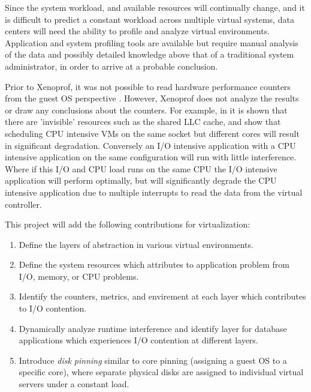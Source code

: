 Since the system workload, and available resources will continually change, and it is difficult to predict a constant workload across multiple virtual systems, data centers will need the ability to profile and analyze virtual environments.  Application and system profiling tools are available but require manual analysis of the data and possibly detailed knowledge above that of a traditional system administrator, in order to arrive at a probable conclusion.   

\indent Prior to Xenoprof, it was not possible to read hardware performance counters from the guest OS perspective \cite{menon, du2}.  However, Xenoprof does not analyze the results or draw any conclusions about the counters.  For example, in \cite{tickoo} it is shown that there are 'invisible' resources such as the shared LLC cache, and show that scheduling CPU intensive VMs on the same socket but different cores will result in significant degradation.  Conversely an I/O intensive application with a CPU intensive application on the same configuration will run with little interference.  Where if this I/O and CPU load runs on the same CPU the I/O intensive application will perform optimally, but will significantly degrade the CPU intensive application due to multiple interrupts to read the data from the virtual controller.

\indent This project will add the following contributions for virtualization:
\begin{enumerate}
\item Define the layers of abstraction in various virtual environments.
\item Define the system resources which attributes to application problem from I/O, memory, or CPU problems.
\item Identify the counters, metrics, and envirement at each layer which contributes to I/O contention.
\item Dynamically analyze runtime interference and identify layer for database applications which experiences I/O contention at different layers.
\item Introduce \emph{disk pinning} similar to core pinning (assigning a guest OS to a specific core), where separate physical disks are assigned to individual virtual servers under a constant load.  
\end{enumerate}

